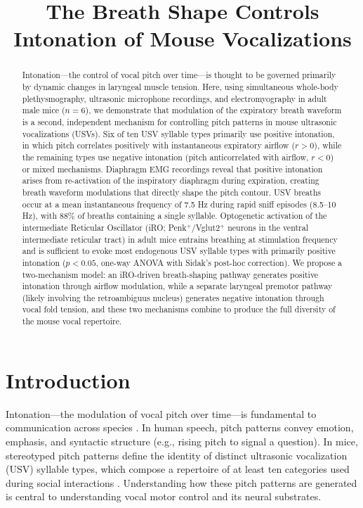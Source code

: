 \documentclass[11pt]{article}
\title{The Breath Shape Controls Intonation of Mouse Vocalizations}
\author{}
\date{}
\begin{document}
\maketitle

\begin{abstract}
Intonation---the control of vocal pitch over time---is thought to be governed primarily by dynamic changes in laryngeal muscle tension. Here, using simultaneous whole-body plethysmography, ultrasonic microphone recordings, and electromyography in adult male mice ($n = 6$), we demonstrate that modulation of the expiratory breath waveform is a second, independent mechanism for controlling pitch patterns in mouse ultrasonic vocalizations (USVs). Six of ten USV syllable types primarily use positive intonation, in which pitch correlates positively with instantaneous expiratory airflow ($r > 0$), while the remaining types use negative intonation (pitch anticorrelated with airflow, $r < 0$) or mixed mechanisms. Diaphragm EMG recordings reveal that positive intonation arises from re-activation of the inspiratory diaphragm during expiration, creating breath waveform modulations that directly shape the pitch contour. USV breaths occur at a mean instantaneous frequency of 7.5 Hz during rapid sniff episodes (8.5--10 Hz), with 88\% of breaths containing a single syllable. Optogenetic activation of the intermediate Reticular Oscillator (iRO; Penk$^+$/Vglut2$^+$ neurons in the ventral intermediate reticular tract) in adult mice entrains breathing at stimulation frequency and is sufficient to evoke most endogenous USV syllable types with primarily positive intonation ($p < 0.05$, one-way ANOVA with Sidak's post-hoc correction). We propose a two-mechanism model: an iRO-driven breath-shaping pathway generates positive intonation through airflow modulation, while a separate laryngeal premotor pathway (likely involving the retroambiguus nucleus) generates negative intonation through vocal fold tension, and these two mechanisms combine to produce the full diversity of the mouse vocal repertoire.
\end{abstract}

\section{Introduction}

Intonation---the modulation of vocal pitch over time---is fundamental to communication across species \citep{lieberman1967intonation}. In human speech, pitch patterns convey emotion, emphasis, and syntactic structure (e.g., rising pitch to signal a question). In mice, stereotyped pitch patterns define the identity of distinct ultrasonic vocalization (USV) syllable types, which compose a repertoire of at least ten categories used during social interactions \citep{holy2005ultrasonic, portfors2007types, kelm2019ultrasonic}. Understanding how these pitch patterns are generated is central to understanding vocal motor control and its neural substrates.
\end{document}
